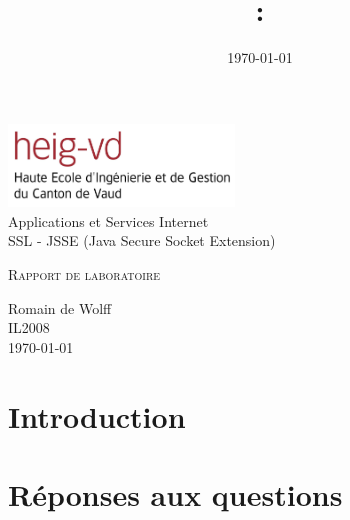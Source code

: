\documentclass[10pt,a4paper,titlepage]{article}
\author{\auteurOne}
\title{\branchetag : \laboname}
\date{\today}
\newcommand{\branche}{Applications et Services Internet}
\newcommand{\laboname}{SSL - JSSE (Java Secure Socket Extension)}
\newcommand{\auteurOne}{Romain de Wolff}
\newcommand{\promo}{IL2008}
\newcommand{\titreDocument}{Rapport de laboratoire}
\begin{document}
\pagestyle{headings}
\begin{titlepage}
	\begin{center}

	\includegraphics[width=6cm]{img/HEIG-VD.jpg}\\
	
		\vspace{3cm}
		\LARGE \branche %
		\vspace{3cm}\\
		\Huge \laboname \\
		\vspace{3cm}

		\Large \textsc{\titreDocument} \\
		\vspace{3cm}

		\large \auteurOne \\
		\vspace{10pt}
		\normalsize \textsc{\promo} \\
		\vspace{1cm}
		\today
	\end{center}
\end{titlepage}

\tableofcontents
\newpage
\pagestyle{fancy}

\section{Introduction}
\section{Réponses aux questions}
\end{document}
